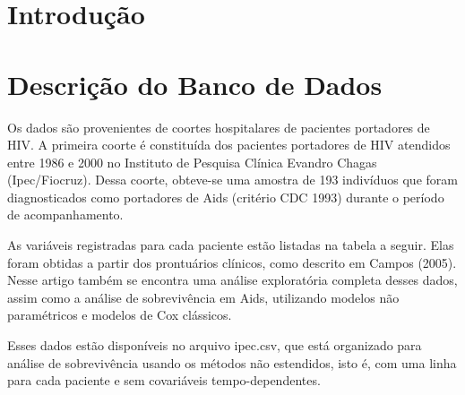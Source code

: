 \documentclass[a4paper, oneside]{book}\usepackage[]{graphicx}\usepackage[]{color}
\begin{document}




\tableofcontents 	


\listoffigures %


\listoftables






  \chapter{Introdução}
  



  \chapter{Descrição do Banco de Dados}
  
Os dados são provenientes de coortes hospitalares de pacientes portadores de HIV. A primeira coorte é constituída dos pacientes portadores de HIV atendidos entre 1986 e 2000 no Instituto de Pesquisa Clínica Evandro Chagas (Ipec/Fiocruz). Dessa coorte, obteve-se uma amostra de 193 indivíduos que foram diagnosticados como portadores de Aids (critério CDC 1993) durante o período de acompanhamento.

As variáveis registradas para cada paciente estão listadas na tabela a seguir. Elas foram obtidas a partir dos prontuários clínicos, como descrito em Campos (2005). Nesse artigo também se encontra uma análise exploratória completa desses dados, assim como a análise de sobrevivência em Aids, utilizando modelos não paramétricos e modelos de Cox clássicos.

Esses dados estão disponíveis no arquivo ipec.csv, que está organizado para análise de sobrevivência usando os métodos não estendidos, isto é, com uma linha para cada paciente e sem covariáveis tempo-dependentes. 
\end{document}
